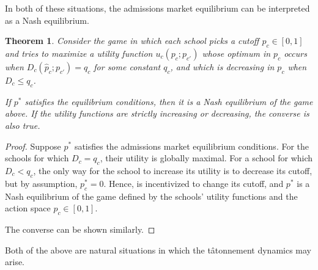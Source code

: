 \documentclass[12pt]{article}
\newtheorem{theorem}{Theorem}
\theoremstyle{definition}
\begin{document}
In both of these situations, the admissions market equilibrium can be interpreted as a Nash equilibrium. 
\begin{theorem}
Consider the game in which each school picks a cutoff $p_c \in [0,1]$ and tries to maximize a utility function $u_c(p_c; p_{c'})$ whose optimum in $p_c$ occurs when $D_c(\hat p_c; p_{c'}) = q_c$ for some constant $q_c$, and which is decreasing in $p_c$ when $D_c \leq q_c$. 

If $p^*$ satisfies the equilibrium conditions, then it is a Nash equilibrium of the game above. If the utility functions are strictly increasing or decreasing, the converse is also true.
\end{theorem}
\begin{proof} Suppose $p^*$ satisfies the admissions market equilibrium conditions. For the schools for which $D_c = q_c$, their utility is globally maximal. For a school for which $D_c < q_c$, the only way for the school to increase its utility is to decrease its cutoff, but by assumption, $p_c^* = 0$. Hence, is incentivized to change its cutoff, and $p^*$ is a Nash equilibrium of the game defined by the schools' utility functions and the action space $p_c \in [0, 1]$.

The converse can be shown similarly.\end{proof}

Both of the above are natural situations in which the t\^{atonnement} dynamics may arise.
\end{document}
